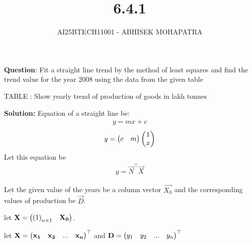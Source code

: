 \documentclass{beamer}
\title{6.4.1}
\author{AI25BTECH11001 - ABHISEK MOHAPATRA}
\numberwithin{equation}{section}
\begin{document}
{\let\newpage\relax\maketitle}
\renewcommand{\thefigure}{\theenumi}
\renewcommand{\thetable}{\theenumi}





	 	\textbf{Question}:
		Fit a straight line trend by the method of least squares and find the trend value for
the year 2008 using the data from the given table


TABLE : Show yearly trend of production of goods in lakh tonnes
\begin{table}[H]
\centering
	
	\caption*{}
	\label{data}
\end{table}


		\textbf{Solution:}
		Equation of a straight line be:
		\begin{align}
				y =  mx + c
		\end{align}
		\begin{align}
				y = \begin{pmatrix}c&m\end{pmatrix}\begin{pmatrix}1\\x\end{pmatrix}
		\end{align}
		Let this equation be 
		\begin{align}
				y = \vec{N}^\top\vec{X}
		\end{align}

		Let the given value of the years be a column vector $\vec{X_0}$ and the corresponding values of production be $\vec{D}$.


		let $\mathbf{X} = \begin{pmatrix}\left(1\right)_{n\times 1}&\mathbf{X_0}\end{pmatrix}$. 

		
		let $\mathbf{X} = \begin{pmatrix}\mathbf{x_1}&\mathbf{x_2}&...&\mathbf{x_n}\end{pmatrix}^\top$
		and $\mathbf{D} = \begin{pmatrix}y_1&y_2&...&y_n\end{pmatrix}^\top$
		
\end{document}
